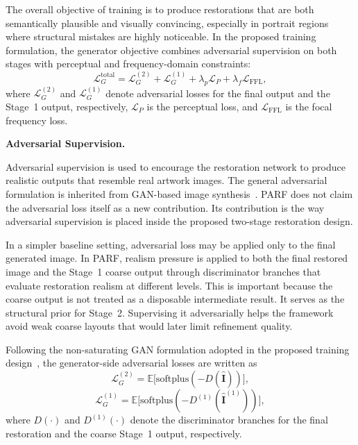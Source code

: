 \documentclass[12pt, twoside]{report}
\begin{document}
The overall objective of training is to produce restorations that are both semantically plausible and visually convincing, especially in portrait regions where structural mistakes are highly noticeable. In the proposed training formulation, the generator objective combines adversarial supervision on both stages with perceptual and frequency-domain constraints:
\begin{equation}
\mathcal{L}_{G}^{\mathrm{total}} =
\mathcal{L}_{G}^{(2)} + \mathcal{L}_{G}^{(1)} + \lambda_{p}\mathcal{L}_{P} + \lambda_{f}\mathcal{L}_{\mathrm{FFL}},
\end{equation}
where $\mathcal{L}_{G}^{(2)}$ and $\mathcal{L}_{G}^{(1)}$ denote adversarial losses for the final output and the Stage~1 output, respectively, $\mathcal{L}_{P}$ is the perceptual loss, and $\mathcal{L}_{\mathrm{FFL}}$ is the focal frequency loss.

\noindent\textbf{Adversarial Supervision.}\par

Adversarial supervision is used to encourage the restoration network to produce realistic outputs that resemble real artwork images. The general adversarial formulation is inherited from GAN-based image synthesis~\cite{goodfellow2014gan}. PARF does not claim the adversarial loss itself as a new contribution. Its contribution is the way adversarial supervision is placed inside the proposed two-stage restoration design.

In a simpler baseline setting, adversarial loss may be applied only to the final generated image. In PARF, realism pressure is applied to both the final restored image and the Stage~1 coarse output through discriminator branches that evaluate restoration realism at different levels. This is important because the coarse output is not treated as a disposable intermediate result. It serves as the structural prior for Stage~2. Supervising it adversarially helps the framework avoid weak coarse layouts that would later limit refinement quality.

Following the non-saturating GAN formulation adopted in the proposed training design~\cite{goodfellow2014gan}, the generator-side adversarial losses are written as
\begin{equation}
\mathcal{L}_{G}^{(2)} = \mathbb{E}\big[\mathrm{softplus}(-D(\hat{\mathbf{I}}))\big],
\end{equation}
\begin{equation}
\mathcal{L}_{G}^{(1)} = \mathbb{E}\big[\mathrm{softplus}(-D^{(1)}(\hat{\mathbf{I}}^{(1)}))\big],
\end{equation}
where $D(\cdot)$ and $D^{(1)}(\cdot)$ denote the discriminator branches for the final restoration and the coarse Stage~1 output, respectively.
\end{document}
